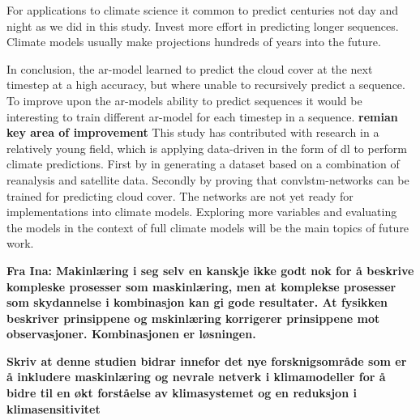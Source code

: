 For applications to climate science it common to predict centuries not day and night as we did in this study. Invest more effort in predicting longer sequences. Climate models usually make projections hundreds of years into the future.

In conclusion, the \acrshort{ar}-model learned to predict the cloud cover at the next timestep at a high accuracy, but where unable to recursively predict a sequence. To improve upon the \acrshort{ar}-models ability to predict sequences it would be interesting to train different \acrshort{ar}-model for each timestep in a sequence. 
\textbf{remian key area of improvement}
This study has contributed with research in a relatively young field, which is applying data-driven in the form of \acrshort{dl} to perform climate predictions. First by in generating a dataset based on a combination of reanalysis and satellite data. Secondly by proving that \acrshort{convlstm}-networks can be trained for predicting cloud cover. The networks are not yet ready for implementations into climate models. Exploring more variables and evaluating the models in the context of full climate models will be the main topics of future work. 


\textbf{Fra Ina: Makinlæring i seg selv en kanskje ikke godt nok for å beskrive kompleske prosesser som maskinlæring, men at komplekse prosesser som skydannelse i kombinasjon kan gi gode resultater. At fysikken beskriver prinsippene og mskinlæring korrigerer prinsippene mot observasjoner. Kombinasjonen er løsningen.}

\textbf{Skriv at denne studien bidrar innefor det nye forsknigsområde som er å inkludere maskinlæring og nevrale netverk i klimamodeller for å bidre til en økt forståelse av klimasystemet og en reduksjon i klimasensitivitet}



